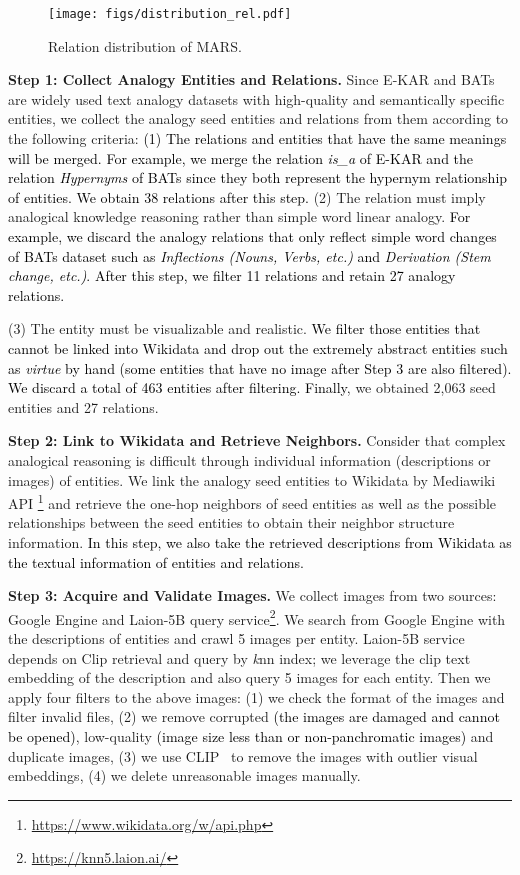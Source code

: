 \documentclass{article} \usepackage{iclr2023_conference,times}
\newcommand{\data}{MARS}
\begin{document}
\begin{figure}[!htp]
\centering
\texttt{[image: figs/distribution\_rel.pdf]}
\caption{Relation distribution of {\data}.}
\label{fig:adx_dis_rel}
\end{figure}

\textbf{Step 1: Collect Analogy Entities and Relations.} 
Since E-KAR and BATs are widely used text analogy datasets with high-quality and semantically specific entities, we collect the analogy seed entities  and relations from them according to the following criteria: 
\textcolor{black}{
(1) The relations and entities that have the same meanings will be merged. For example, we merge the relation \textit{is\_a} of E-KAR and the relation \textit{Hypernyms} of BATs since they both represent the hypernym relationship     of entities. We obtain 38 relations after this step.}
(2) The relation must imply analogical knowledge reasoning rather than simple word linear analogy. \textcolor{black}{For example, we discard the analogy relations that only reflect simple word changes of BATs dataset such as \textit{Inflections (Nouns, Verbs, etc.)} and \textit{Derivation (Stem change, etc.)}. After this step, we filter 11 relations and retain 27 analogy relations.}

(3) The entity must be visualizable and realistic. \textcolor{black}{We filter those entities that cannot be linked into Wikidata and drop out the extremely abstract entities such as \textit{virtue} by hand (some entities that have no image after Step 3 are also filtered). We discard a total of 463 entities after filtering. Finally}, we obtained 2,063 seed entities and 27 relations.


\textbf{Step 2: Link to Wikidata and Retrieve Neighbors.} 
Consider that complex analogical reasoning is difficult through individual information (descriptions or images) of entities. 
We link the analogy seed entities to Wikidata by Mediawiki API \footnote{\url{https://www.wikidata.org/w/api.php}} and retrieve the one-hop neighbors of seed entities as well as the possible relationships between the seed entities to obtain their neighbor structure information. \textcolor{black}{In this step, we also take the retrieved descriptions from Wikidata as the textual information of entities and relations.
}

\textbf{Step 3: Acquire and Validate Images.}
We collect images from two sources: Google Engine and Laion-5B query service\footnote{\url{https://knn5.laion.ai/}}. We search from Google Engine with the descriptions of entities and crawl 5 images per entity. 
Laion-5B service depends on Clip retrieval and query by \textit{k}nn index; we leverage the clip text embedding of the description and also query 5 images for each entity. 
Then we apply four filters to the above images: 
(1) we check the format of the images and filter invalid files, 
(2) we remove corrupted \textcolor{black}{(the images are damaged and cannot be opened)}, low-quality \textcolor{black}{(image size less than  or non-panchromatic images)} and duplicate images, 
(3) we use CLIP~\citep{CLIP} to remove the images with outlier visual embeddings,
(4) we delete unreasonable images manually. 
\end{document}
